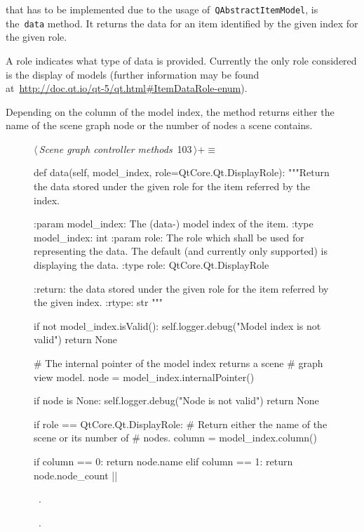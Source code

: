 \documentclass[%
    a4paper,    %
    justified,  %
    nobib,      %
    openany     %
]{tufte-book}
\makeatletter
\renewcommand{\label}[1]{\@tufte@label{##1}}%
\makeatother
\begin{document}
 that has to be implemented due to the usage
of~\verb=QAbstractItemModel=, is the~\verb=data= method. It returns the data for
an item identified by the given index for the given role.

A role indicates what type of data is provided. Currently the only role
considered is the display of models (further information may be found
at~\url{http://doc.qt.io/qt-5/qt.html#ItemDataRole-enum}).

Depending on the column of the model index, the method returns either the name
of the scene graph node or the number of nodes a scene contains.

\begin{figure}[!htbp]
\begin{flushleft} \small
\begin{minipage}{\linewidth}\label{scrap34}\raggedright\small
{} $\langle\,${\itshape Scene graph controller methods}\nobreak\ {\footnotesize {103}}$\,\rangle+\equiv$
\vspace{-1ex}
\begin{pythoncode}
def data(self, model_index, role=QtCore.Qt.DisplayRole):
    """Return the data stored under the given role for the item
    referred by the index.

    :param model_index: The (data-) model index of the item.
    :type model_index: int
    :param role: The role which shall be used for representing
                 the data. The default (and currently only
                 supported) is displaying the data.
    :type role:  QtCore.Qt.DisplayRole

    :return: the data stored under the given role for the item
             referred by the given index.
    :rtype:  str
    """

    if not model_index.isValid():
        self.logger.debug("Model index is not valid")
        return None

    # The internal pointer of the model index returns a scene
    # graph view model.
    node = model_index.internalPointer()

    if node is None:
        self.logger.debug("Node is not valid")
        return None

    if role == QtCore.Qt.DisplayRole:
        # Return either the name of the scene or its number of
        # nodes.
        column = model_index.column()

        if column == 0:
            return node.name
        elif column == 1:
            return node.node_count
|\NWsep|
\end{pythoncode}
\vspace{1.5ex}
\footnotesize
\begin{list}{}{\setlength{\itemsep}{-\parsep}\setlength{\itemindent}{-\leftmargin}}
\item \NWtxtMacroDefBy\ .
\item \NWtxtMacroRefIn\ .


\end{list}
\end{minipage}
\end{flushleft}
\end{figure}
\end{document}
